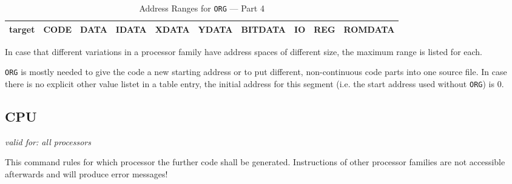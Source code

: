 \documentclass[12pt,twoside]{report}
\makeatletter
\newcommand{\tty}[1]{{\tt #1}}
\newcommand{\tin}[1]{{\scriptsize #1}}
\newcommand{\ttindex}[1]{\index{#1@{\tt #1}}}
\makeatother
\begin{document}
\begin{table*}[htbp]
\begin{center}\begin{tabular}{|l|c|c|c|c|c|c|c|c|c|}
\hline
\tin{target} & \tin{CODE} & \tin{DATA} & \tin{IDATA} & \tin{XDATA} & \tin{YDATA} & \tin{BITDATA} & \tin{IO} & \tin{REG} & \tin{ROMDATA} \\
\hline
\hline

\hline
\end{tabular}\end{center}
\caption{Address Ranges for \tty{ORG} --- Part 4\label{TabORG4}}
\end{table*}
\normalsize

In case that different variations in a processor family have address
spaces of different size, the maximum range is listed for each.

\tty{ORG} is mostly needed to give the code a new starting address or to
put different, non-continuous code parts into one source file.  In case
there is no explicit other value listet in a table entry, the initial
address for this segment (i.e. the start address used without {\tt ORG})
is 0.


\subsection{CPU}
\ttindex{CPU}

{\em valid for: all processors}

This command rules for which processor the further code shall be
generated.  Instructions of other processor families are not
accessible afterwards and will produce error messages!
\end{document}
